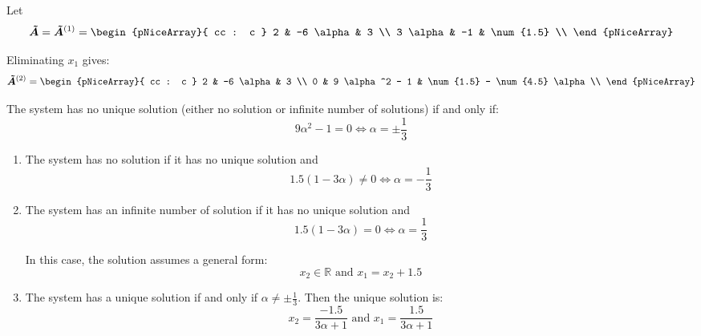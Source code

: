 \documentclass[../../../../Assignments]{subfiles}
\begin{document}
\begin{solution}
    Let
    \[
        \bm{\tilde{A}} = \bm{\tilde{A}}^{(1)} =
            \begin{pNiceArray}{ cc : c }
                2         &  -6 \alpha  &  3          \\
                3 \alpha  &         -1  &  \num{1.5}  \\
            \end{pNiceArray}
    \]

    Eliminating \(x_1\) gives:
    \[
        \bm{\tilde{A}}^{(2)} =
            \begin{pNiceArray}{ cc : c }
                2  &  -6 \alpha       &  3          \\
                0  &  9 \alpha^2 - 1  &  \num{1.5} - \num{4.5} \alpha  \\
            \end{pNiceArray}
    \]

    The system has no unique solution (either no solution or infinite number of
    solutions) if and only if:
    \[9 \alpha^2 - 1 = 0 \iff \alpha = \pm \frac{1}{3}\]

    \begin{enumerate}[label = \alph*)]
        \item The system has no solution if it has no unique solution and
            \[\num{1.5}(1 - 3 \alpha) \neq 0 \iff \alpha = -\frac{1}{3}\]

        \item The system has an infinite number of solution if it has no unique
            solution and
            \[\num{1.5}(1 - 3 \alpha) = 0 \iff \alpha = \frac{1}{3}\]

            In this case, the solution assumes a general form:
            \[x_2 \in \mathbb{R} \text{ and } x_1 = x_2 + \num{1.5}\]

        \item The system has a unique solution if and only if \(\alpha \neq \pm
            \frac{1}{3}\). Then the unique solution is:
            \[x_2 = \frac{\num{-1.5}}{3 \alpha + 1} \text{ and } x_1 = \frac{\num{1.5}}{3 \alpha + 1}\]
    \end{enumerate}
\end{solution}
\end{document}
